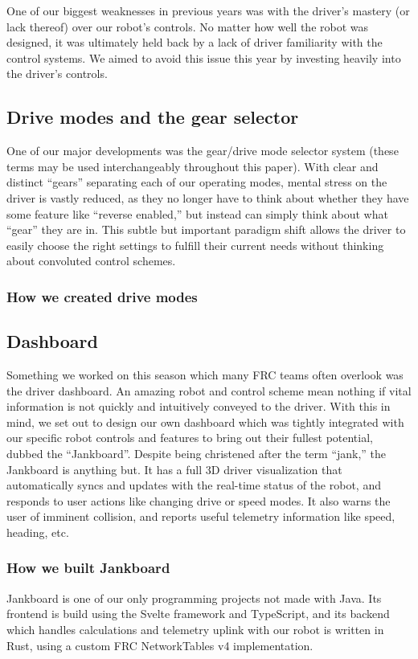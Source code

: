 One of our biggest weaknesses in previous years was with the driver's
mastery (or lack thereof) over our robot's controls. No matter how well
the robot was designed, it was ultimately held back by a lack of driver
familiarity with the control systems. We aimed to avoid this issue this
year by investing heavily into the driver's controls.

\subsection{Drive modes and the gear selector}

One of our major developments was the gear/drive mode selector system
(these terms may be used interchangeably throughout this paper). With
clear and distinct ``gears'' separating each of our operating modes,
mental stress on the driver is vastly reduced, as they no longer have to
think about whether they have some feature like ``reverse enabled,'' but
instead can simply think about what ``gear'' they are in. This subtle
but important paradigm shift allows the driver to easily choose the
right settings to fulfill their current needs without thinking about
convoluted control schemes.

\subsubsection{How we created drive modes}
\blindtext{}

\subsection{Dashboard}

Something we worked on this season which many FRC teams often overlook
was the driver dashboard. An amazing robot and control scheme mean
nothing if vital information is not quickly and intuitively conveyed to
the driver. With this in mind, we set out to design our own dashboard
which was tightly integrated with our specific robot controls and
features to bring out their fullest potential, dubbed the ``Jankboard''.
Despite being christened after the term ``jank,'' the Jankboard is
anything but. It has a full 3D driver visualization that automatically
syncs and updates with the real-time status of the robot, and responds
to user actions like changing drive or speed modes. It also warns the
user of imminent collision, and reports useful telemetry information
like speed, heading, etc.

\subsubsection{How we built Jankboard}

Jankboard is one of our only programming projects not made with Java.
Its frontend is build using the Svelte framework and TypeScript, and its
backend which handles calculations and telemetry uplink with our robot
is written in Rust, using a custom FRC NetworkTables v4 implementation.
